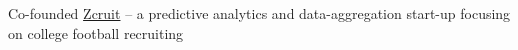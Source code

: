 \documentclass[10pt,a4paper,ragged2em, academicons]{altacv}
\begin{document}


Co-founded \href{https://www.zcruit.com/}{Zcruit} -- a predictive analytics and data-aggregation start-up focusing on college football recruiting



\clearpage
\end{document}
